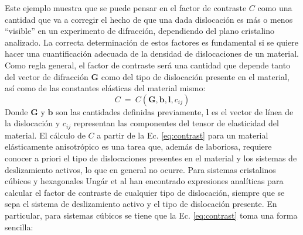 Este ejemplo muestra que se puede pensar en el factor de contraste $C$ como una cantidad que va a corregir el hecho de que una dada dislocación es más o menos ``visible'' en un experimento de difracción, dependiendo del plano cristalino analizado.
La correcta determinación de estos factores es fundamental si se quiere hacer una cuantificación adecuada de la densidad de dislocaciones de un material.
Como regla general, el factor de contraste será una cantidad que depende tanto del vector de difracción $\mathbf{G}$ como del tipo de dislocación presente en el material, así como de las constantes elásticas del material mismo:
\begin{equation}
  C \ = \ C(\mathbf{G},\mathbf{b},\mathbf{l},c_{ij})
  \label{eq:contrast}
\end{equation}
\noindent
Donde $\mathbf{G}$ y $\mathbf{b}$ son las cantidades definidas previamente, $\mathbf{l}$ es el vector de línea de la dislocación y $c_{ij}$ representan las componentes del tensor de elasticidad del material.
El cálculo de $C$ a partir de la Ec. \ref{eq:contrast} para un material elásticamente anisotrópico es una tarea que, además de laboriosa, requiere conocer a priori el tipo de dislocaciones presentes en el material y los sistemas de deslizamiento activos, lo que en general no ocurre.
Para sistemas cristalinos cúbicos y hexagonales Ungár et al\cite{Dragomir1999,Dragomir2002} han encontrado expresiones analíticas para calcular el factor de contraste de cualquier tipo de dislocación, siempre que se sepa el sistema de deslizamiento activo y el tipo de dislocación presente. En particular, para sistemas cúbicos se tiene que la Ec. \ref{eq:contrast} toma una forma sencilla:

